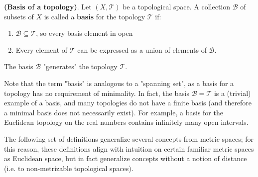 \begin{framed}
\begin{defn}
    \textbf{(Basis of a topology)}. Let $(X,\mathcal{T})$ be a topological space. A collection $\mathcal{B}$ of subsets of $X$ is called a \textbf{basis} for the topology $\mathcal{T}$ if:\vspace{-1em}\begin{enumerate}
        \item[-] $\mathcal{B}\subseteq \mathcal{T}$, so every basis element in open
        \item[-] Every element of $\mathcal{T}$ can be expressed as a union of elements of $\mathcal{B}$.
    \end{enumerate} The basis $\mathcal{B}$ "generates" the topology $\mathcal{T}$.
\end{defn}
\end{framed}
Note that the term "basis" is analogous to a "spanning set", as a basis for a topology has no requirement of minimality. In fact, the basis $\mathcal{B}=\mathcal{T}$ is a (trivial) example of a basis, and many topologies do not have a finite basis (and therefore a minimal basis does not necessarily exist). For example, a basis for the Euclidean topology on the real numbers contains infinitely many open intervals.

The following set of definitions generalize several concepts from metric spaces; for this reason, these definitions align with intuition on certain familiar metric spaces as Euclidean space, but in fact generalize concepts without a notion of distance (i.e. to non-metrizable topological spaces).

